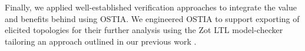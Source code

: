 Finally, we applied well-established verification approaches to integrate the value and benefits behind using OSTIA. We engineered OSTIA to support exporting of elicited topologies for their further analysis using the Zot LTL model-checker \cite{zot} tailoring an approach outlined in our previous work \cite{icsoft}.
